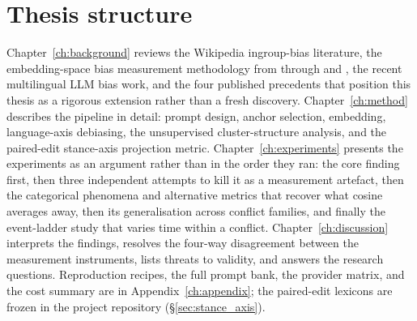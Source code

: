 \section{Thesis structure}\label{sec:structure}

Chapter~\ref{ch:background} reviews the Wikipedia ingroup-bias
literature, the embedding-space bias measurement methodology
from \citet{bolukbasi2016man} through
\citet{caliskan2017semantics} and \citet{may2019}, the recent
multilingual LLM bias work, and the four published precedents
that position this thesis as a rigorous extension rather than
a fresh discovery. Chapter~\ref{ch:method} describes the
pipeline in detail: prompt design, anchor selection, embedding,
language-axis debiasing, the unsupervised cluster-structure
analysis, and the paired-edit stance-axis projection metric.
Chapter~\ref{ch:experiments} presents the experiments as an
argument rather than in the order they ran: the core finding
first, then three independent attempts to kill it as a
measurement artefact, then the categorical phenomena and
alternative metrics that recover what cosine averages away, then
its generalisation across conflict families, and finally the
event-ladder study that varies time within a conflict. Chapter~\ref{ch:discussion} interprets the
findings, resolves the four-way disagreement between the
measurement instruments, lists threats to validity, and answers
the research questions. Reproduction
recipes, the full prompt bank, the provider matrix, and the cost
summary are in Appendix~\ref{ch:appendix}; the paired-edit
lexicons are frozen in the project repository
(\S\ref{sec:stance_axis}).
